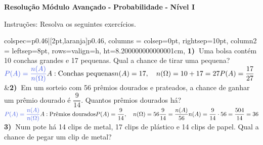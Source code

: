 \documentclass[12pt,twoside]{article}
\newcommand{\BI}[1]{\textbf{\textcolor{iris}{#1}}}
\newcommand{\BL}[1]{\textbf{\textcolor{laranja}{#1}}}
\newcommand{\BV}[1]{\textbf{\textcolor{verde}{#1}}}
\newcommand{\BC}[1]{\textbf{\textcolor{cinza}{#1}}}
\newcommand{\BB}[1]{\textbf{\textcolor{babyblue}{#1}}}
\begin{document}
\newpage 
{} 
\normalsize 
\setlength{\tabcolsep}{0em} 
\setlength\parindent{0pt} 
\BB{\Large Resolução} \quad \footnotesize \BI{Módulo Avançado} \BL{-} \BV{Probabilidade} \BL{-} \BC{Nível I}
\vspace{0.3cm}

\small
\textcolor{laranja}{Instruções: } \textcolor{cinza}{Resolva os seguintes exercícios.}
\vspace{0.1cm}



\footnotesize
\begin{tblr}{
colspec={p{0.46\textwidth}|[2pt,laranja]p{0.46\textwidth}},
columns = {colsep=0pt, rightsep=10pt},
column{2} = {leftsep=8pt},
rows={valign=h, ht=8.200000000000001cm},
}
\BI{1)~}{Uma bolsa contém 10 conchas grandes e 17 pequenas. Qual a chance de tirar uma pequena?}\vspace{5px}  \newline 
{$\definecolor{azulEscuro}{rgb}{0.25, 0.35, 0.89}\definecolor{rosaClaro}{rgb}{1, 0.52, 0.60}\textcolor{azulEscuro}{P(A)=\dfrac{n(A)}{n(\Omega)}} \vspace{5px} \\A: \text{Conchas pequenas} \\n(A)=17,\quad n(\Omega)=10+17=27 \vspace{5px} \\P(A)=\dfrac{17}{27}$} &\BI{2)~}{Em um sorteio com 56 prêmios dourados e prateados, a chance de ganhar um prêmio dourado é \(\dfrac{9}{14}\). Quantos prêmios dourados há?}\vspace{5px}  \newline 
{$\definecolor{azulEscuro}{rgb}{0.25, 0.35, 0.89}\definecolor{rosaClaro}{rgb}{1, 0.52, 0.60}\textcolor{azulEscuro}{P(A)=\dfrac{n(A)}{n(\Omega)}} \vspace{5px} \\A: \text{Prêmios dourados} \vspace{5px} \\P(A)=\dfrac{9}{14},\quad n(\Omega)=56 \vspace{5px} \\\dfrac{9}{14}=\dfrac{n(A)}{56} \vspace{5px} \\n(A)=\dfrac{9}{14}\cdot 56=\dfrac{504}{14}=36$} \\ 
\BI{3)~}{Num pote há 14 clips de metal, 17 clips de plástico e 14 clips de papel. Qual a chance de pegar um clip de metal?}\vspace{5px}  \newline 

\end{tblr}
\end{document}
